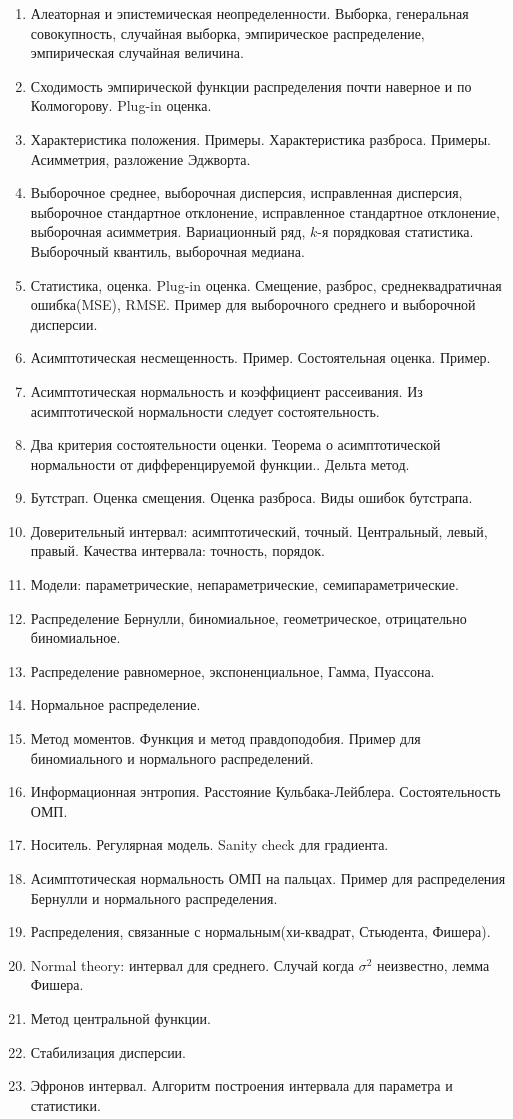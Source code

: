 
\begin{enumerate}
	\item Алеаторная и эпистемическая неопределенности. Выборка, генеральная совокупность, случайная выборка, эмпирическое распределение, эмпирическая случайная величина.
	\item Сходимость эмпирической функции распределения почти наверное и по Колмогорову. Plug-in оценка.
	\item Характеристика положения. Примеры. Характеристика разброса. Примеры. Асимметрия, разложение Эджворта.
	\item Выборочное среднее, выборочная дисперсия, исправленная дисперсия, выборочное стандартное отклонение, исправленное стандартное отклонение, выборочная асимметрия. Вариационный ряд, $k$-я порядковая статистика. Выборочный квантиль, выборочная медиана.
	\item Статистика, оценка. Plug-in оценка. Смещение, разброс, среднеквадратичная ошибка(MSE), RMSE. Пример для выборочного среднего и выборочной дисперсии.
	\item Асимптотическая несмещенность. Пример. Состоятельная оценка. Пример. 
	\item Асимптотическая нормальность и коэффициент рассеивания. Из асимптотической нормальности следует состоятельность.
	\item Два критерия состоятельности оценки. Теорема о асимптотической нормальности от дифференцируемой функции.. Дельта метод.
	\item Бутстрап. Оценка смещения. Оценка разброса. Виды ошибок бутстрапа.
	\item Доверительный интервал: асимптотический, точный. Центральный, левый, правый. Качества интервала: точность, порядок.
	\item Модели: параметрические, непараметрические, семипараметрические. 
	\item Распределение Бернулли, биномиальное, геометрическое, отрицательно биномиальное.
	\item Распределение равномерное, экспоненциальное, Гамма, Пуассона.
	\item Нормальное распределение.
	\item Метод моментов. Функция и метод правдоподобия. Пример для биномиального и нормального распределений.
	\item Информационная энтропия. Расстояние Кульбака-Лейблера. Состоятельность ОМП.

	\item Носитель. Регулярная модель. Sanity check для градиента.
	\item Асимптотическая нормальность ОМП на пальцах. Пример для распределения Бернулли и нормального распределения.
	\item Распределения, связанные с нормальным(хи-квадрат, Стьюдента, Фишера).
	\item Normal theory: интервал для среднего. Случай когда $\sigma^2$ неизвестно, лемма Фишера.
	\item Метод центральной функции.
	\item Стабилизация дисперсии.
	\item Эфронов интервал. Алгоритм построения интервала для параметра и статистики.
	
\end{enumerate}
